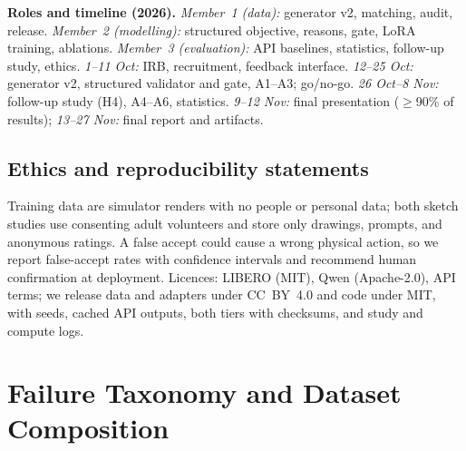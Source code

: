 \documentclass{article} %
\begin{document}
\textbf{Roles and timeline (2026).} \emph{Member~1 (data):} generator v2, matching, audit, release. \emph{Member~2 (modelling):} structured objective, reasons, gate, LoRA training, ablations. \emph{Member~3 (evaluation):} API baselines, statistics, follow-up study, ethics. \emph{1--11 Oct:} IRB, recruitment, feedback interface. \emph{12--25 Oct:} generator v2, structured validator and gate, A1--A3; go/no-go. \emph{26 Oct--8 Nov:} follow-up study (H4), A4--A6, statistics. \emph{9--12 Nov:} final presentation ($\ge$90\% of results); \emph{13--27 Nov:} final report and artifacts.

\subsection*{Ethics and reproducibility statements}
Training data are simulator renders with no people or personal data; both sketch studies use consenting adult volunteers and store only drawings, prompts, and anonymous ratings. A false accept could cause a wrong physical action, so we report false-accept rates with confidence intervals and recommend human confirmation at deployment. Licences: LIBERO (MIT), Qwen (Apache-2.0), API terms; we release data and adapters under CC~BY~4.0 and code under MIT, with seeds, cached API outputs, both tiers with checksums, and study and compute logs.




\raggedbottom
\appendix
\section{Failure Taxonomy and Dataset Composition}
\label{app:taxonomy}
\end{document}
